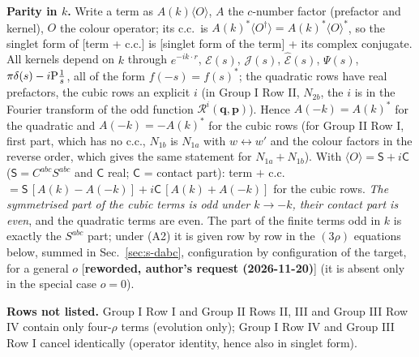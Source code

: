 \documentclass[9pt]{article}
\numberwithin{equation}{section}
\begin{document}
{\noindent\textbf{Parity in $k$.} Write a term as $A(k)\langle O\rangle$, $A$ the $c$-number factor (prefactor and kernel), $O$ the colour operator; its c.c.\ is $A(k)^{*}\langle O^{\dagger}\rangle=A(k)^{*}\langle O\rangle^{*}$, so the singlet form of [term + c.c.] is [singlet form of the term] + its complex conjugate. All kernels depend on $k$ through $e^{-ik\cdot r}$, $\mathcal{E}(s)$, $\mathcal{J}(s)$, $\widehat{\mathcal{E}}(s)$, $\Psi(s)$, $\pi\delta(s)-i{\rm P}\frac1s$, all of the form $f(-s)=f(s)^{*}$; the quadratic rows have real prefactors, the cubic rows an explicit $i$ (in Group I Row II, $N_{2b}$, the $i$ is in the Fourier transform of the odd function $\mathcal{R}^{i}(\mathbf{q},\mathbf{p})$). Hence $A(-k)=A(k)^{*}$ for the quadratic and $A(-k)=-A(k)^{*}$ for the cubic rows (for Group II Row I, first part, which has no c.c., $N_{1b}$ is $N_{1a}$ with $w\leftrightarrow w'$ and the colour factors in the reverse order, which gives the same statement for $N_{1a}+N_{1b}$). With $\langle O\rangle=\mathsf{S}+i\mathsf{C}$ ($\mathsf{S}=C^{abc}S^{abc}$ and $\mathsf{C}$ real; $\mathsf{C}$ = contact part): term $+$ c.c.\ $=\mathsf{S}\,[A(k)-A(-k)]+i\mathsf{C}\,[A(k)+A(-k)]$ for the cubic rows. \emph{The symmetrised part of the cubic terms is odd under $k\to-k$, their contact part is even}, and the quadratic terms are even. The part of the finite terms odd in $k$ is exactly the $S^{abc}$ part; under (A2) it is given row by row in the $(3\rho)$ equations below, summed in Sec.~\ref{sec:s-dabc}, configuration by configuration of the target, for a general $o$ [\textbf{reworded, author's request (2026-11-20)}] (it is absent only in the special case $o=0$).

\noindent\textbf{Rows not listed.} Group I Row I and Group II Rows II, III and Group III Row IV contain only four-$\rho$ terms (evolution only); Group I Row IV and Group III Row I cancel identically (operator identity, hence also in singlet form).

}
\end{document}
